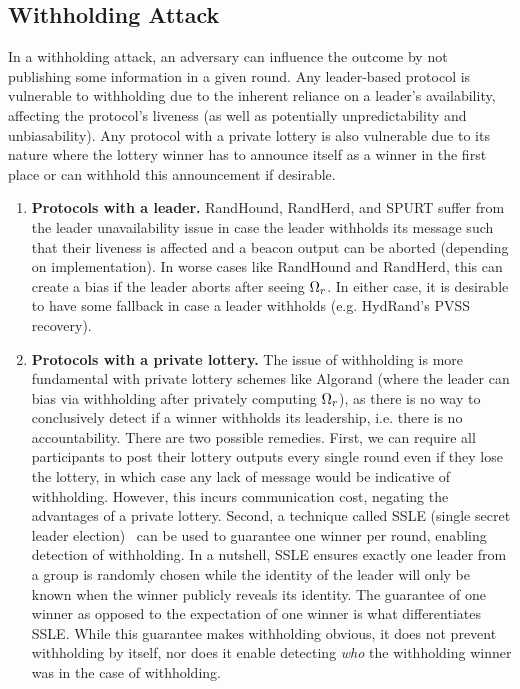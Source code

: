 \subsection{Withholding Attack}
\label{subsection:withholding}
In a withholding attack, an adversary can influence the outcome by not publishing some information in a given round. Any leader-based protocol is vulnerable to withholding due to the inherent reliance on a leader's availability, affecting the protocol's liveness (as well as potentially unpredictability and unbiasability). Any protocol with a private lottery is also vulnerable due to its nature where the lottery winner has to announce itself as a winner in the first place or can withhold this announcement if desirable.
\begin{enumerate}
\item \textbf{Protocols with a leader.} RandHound, RandHerd, and SPURT suffer from the leader unavailability issue in case the leader withholds its message such that their liveness is affected and a beacon output can be aborted (depending on implementation). In worse cases like RandHound and RandHerd, this can create a bias if the leader aborts after seeing $\Omega_r$. In either case, it is desirable to have some fallback in case a leader withholds (e.g. HydRand's PVSS recovery).
\item \textbf{Protocols with a private lottery.} The issue of withholding is more fundamental with private lottery schemes like Algorand (where the leader can bias via withholding after privately computing $\Omega_r$), as there is no way to conclusively detect if a winner withholds its leadership, i.e. there is no accountability. There are two possible remedies. First, we can require all participants to post their lottery outputs every single round even if they lose the lottery, in which case any lack of message would be indicative of withholding. However, this incurs communication cost, negating the advantages of a private lottery. Second, a technique called SSLE (single secret leader election)~\cite{boneh2020single} can be used to guarantee one winner per round, enabling detection of withholding. In a nutshell, SSLE ensures exactly one leader from a group is randomly chosen while the identity of the leader will only be known when the winner publicly reveals its identity. The guarantee of one winner as opposed to the expectation of one winner is what differentiates SSLE. While this guarantee makes withholding obvious, it does not prevent withholding by itself, nor does it enable detecting \emph{who} the withholding winner was in the case of withholding.
\end{enumerate}

